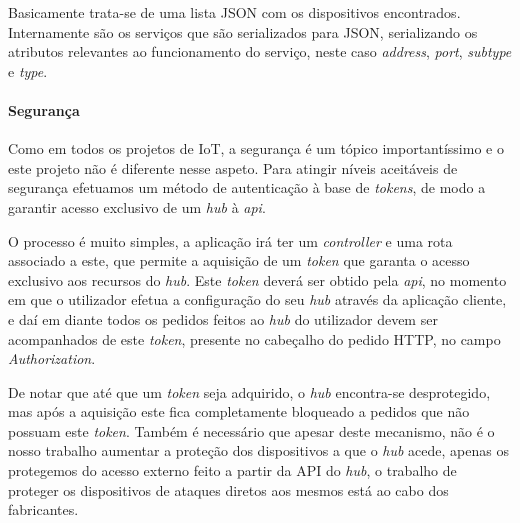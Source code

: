 Basicamente trata-se de uma lista JSON com os dispositivos encontrados. Internamente são os serviços que são serializados para JSON, serializando os atributos relevantes ao funcionamento do serviço, neste caso \textit{address}, \textit{port}, \textit{subtype} e \textit{type}.

\paragraph*{Segurança}

Como em todos os projetos de IoT, a segurança é um tópico importantíssimo e o este projeto não é diferente nesse aspeto. Para atingir níveis aceitáveis de segurança efetuamos um método de autenticação à base de \textit{tokens}, de modo a garantir acesso exclusivo de um \textit{hub} à \textit{api}.

O processo é muito simples, a aplicação irá ter um \textit{controller} e uma rota associado a este, que permite a aquisição de um \textit{token} que garanta o acesso exclusivo aos recursos do \textit{hub}. Este \textit{token} deverá ser obtido pela \textit{api}, no momento em que o utilizador efetua a configuração do seu \textit{hub} através da aplicação cliente, e daí em diante todos os pedidos feitos ao \textit{hub} do utilizador devem ser acompanhados de este \textit{token}, presente no cabeçalho do pedido HTTP, no campo \textit{Authorization}. 

De notar que até que um \textit{token} seja adquirido, o \textit{hub} encontra-se desprotegido, mas após a aquisição este fica completamente bloqueado a pedidos que não possuam este \textit{token}. Também é necessário que apesar deste mecanismo, não é o nosso trabalho aumentar a proteção dos dispositivos a que o \textit{hub} acede, apenas os protegemos do acesso externo feito a partir da API do \textit{hub}, o trabalho de proteger os dispositivos de ataques diretos aos mesmos está ao cabo dos fabricantes.